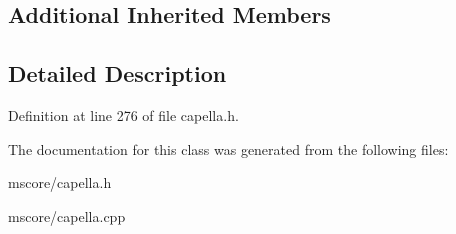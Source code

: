 \subsection*{Additional Inherited Members}


\subsection{Detailed Description}


Definition at line 276 of file capella.\+h.



The documentation for this class was generated from the following files\+:\begin{DoxyCompactItemize}
\item 
mscore/capella.\+h\item 
mscore/capella.\+cpp\end{DoxyCompactItemize}
